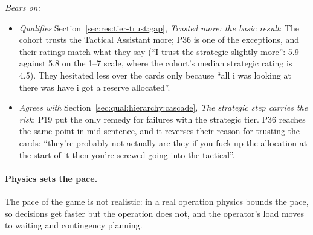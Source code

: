 \noindent\textit{Bears on:}
\begin{itemize}[leftmargin=1.2em,itemsep=1pt]\small
\item \textit{Qualifies} Section~\ref{sec:res:tier-trust:gap}, \emph{Trusted more: the basic result}: The cohort trusts the Tactical Assistant more; P36 is one of the exceptions, and their ratings match what they say (``I trust the strategic slightly more'': 5.9 against 5.8 on the 1--7 scale, where the cohort's median strategic rating is 4.5). They hesitated less over the cards only because ``all i was looking at there was have i got a reserve allocated''.
\item \textit{Agrees with} Section~\ref{sec:qual:hierarchy:cascade}, \emph{The strategic step carries the risk}: P19 put the only remedy for failures with the strategic tier. P36 reaches the same point in mid-sentence, and it reverses their reason for trusting the cards: ``they're probably not actually are they if you fuck up the allocation at the start of it then you're screwed going into the tactical''.
\end{itemize}


\label{sec:qual:practitioner:pt-physics-pace}\paragraph{Physics sets the pace.}
The pace of the game is not realistic: in a real operation physics bounds the pace, so decisions get faster but the operation does not, and the operator's load moves to waiting and contingency planning.

